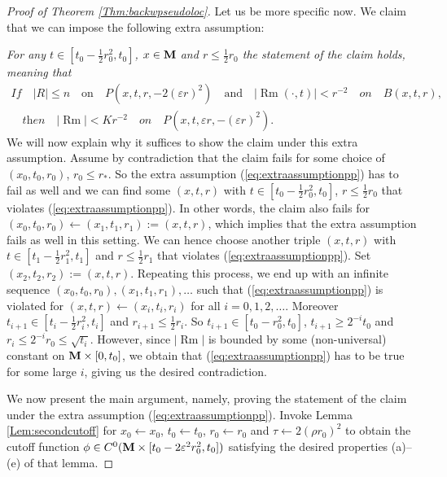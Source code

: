 \documentclass[11pt]{amsart}
\numberwithin{equation}{section}
\def\M{{\bf M}}
\DeclareMathOperator{\Rm}{Rm}
\numberwithin{equation}{section}
\begin{document}
\begin{proof}[Proof of Theorem \ref{Thm:backwpseudoloc}]
Let us be more specific now.
We claim that we can impose the following extra assumption:

{\it For any $t \in [t_0 - \frac12 r_0^2, t_0]$, $x \in \M$ and $r \leq \frac12 r_0$ the statement of the claim holds, meaning that}
\begin{multline} \label{eq:extraassumptionpp}
 \textit{If}  \quad |R| \leq n \quad \text{on} \quad P(x,t,r, - 2 (\varepsilon r)^2) \quad \text{and} \quad  |{\Rm (\cdot, t) }| < r^{-2} \quad \textit{on} \quad B(x, t, r), \\
  \quad \textit{then} \quad |{\Rm}| < K r^{-2} \quad \textit{on} \quad P (x,t, \varepsilon r, - (\varepsilon r)^2).
\end{multline}
We will now explain why it suffices to show the claim under this extra assumption.
Assume by contradiction that the claim fails for some choice of $(x_0, t_0, r_0)$, $r_0 \leq r_*$.
So the extra assumption (\ref{eq:extraassumptionpp}) has to fail as well and we can find some $(x, t, r)$ with $t \in [t_0 - \frac12 r_0^2, t_0]$, $r \leq \frac12 r_0$ that violates (\ref{eq:extraassumptionpp}).
In other words, the claim also fails for $(x_0, t_0, r_0) \leftarrow (x_1, t_1, r_1) := (x,t,r)$, which implies that the extra assumption fails as well in this setting.
We can hence choose another triple $(x,t,r)$ with $t \in [t_1 - \frac12 r_1^2, t_1]$ and $r \leq \frac12 r_1$ that violates (\ref{eq:extraassumptionpp}).
Set $(x_2, t_2, r_2) := (x,t,r)$.
Repeating this process, we end up with an infinite sequence $(x_0, t_0, r_0), (x_1, t_1, r_1), \ldots$ such that (\ref{eq:extraassumptionpp}) is violated for $(x, t, r) \leftarrow (x_i, t_i, r_i)$ for all $i = 0, 1, 2, \ldots$.
Moreover $t_{i+1} \in [t_i - \frac12 r_i^2, t_i]$ and $r_{i+1} \leq \frac12 r_i$.
So $t_{i+1} \in [t_0 - r_0^2, t_0]$, $t_{i+1} \geq 2^{-i} t_0$ and $r_i \leq 2^{-i} r_0 \leq \sqrt{t_i}$.
However, since $|{\Rm}|$ is bounded by some (non-universal) constant on $\M \times [0,t_0]$, we obtain that (\ref{eq:extraassumptionpp}) has to be true for some large $i$, giving us the desired contradiction.

We now present the main argument, namely, proving the statement of the claim under the extra assumption  (\ref{eq:extraassumptionpp}).
Invoke Lemma \ref{Lem:secondcutoff} for $x_0 \leftarrow x_0$, $t_0 \leftarrow t_0$, $r_0 \leftarrow  r_0$ and $\tau \leftarrow 2 (\rho r_0)^2$ to obtain the cutoff function $\phi \in C^0 ( \M \times [ t_0 - 2 \varepsilon^2 r_0^2, t_0 ])$ satisfying the desired properties (a)--(e) of that lemma.


\end{proof}
\end{document}
